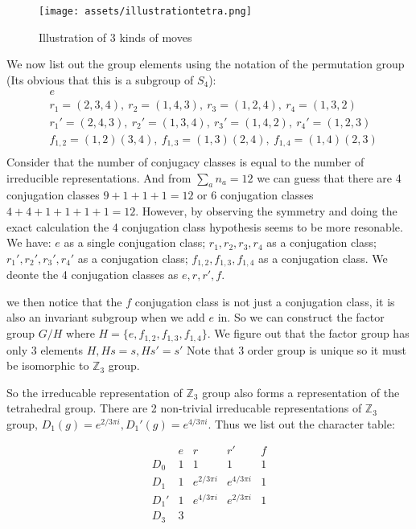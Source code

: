 \begin{figure}[H]
  \centering
  \texttt{[image: assets/illustrationtetra.png]}
  \caption{Illustration of 3 kinds of moves}
  \label{fig:illustrationtetra}
\end{figure}
We now list out the group elements using the notation of the permutation group (Its obvious that this is a subgroup of $ S_4 $):
\begin{equation}
  \begin{aligned}
    &e\\ 
    &r_1 = (2,3,4),\  r_2 = (1,4,3), \ r_3 = (1,2,4), \ r_4 = (1,3,2)\\ 
    &r_1' = (2,4,3),\  r_2' = (1,3,4),\  r_3' = (1,4,2),\  r_4' = (1,2,3)\\
    &f_{1,2} = (1,2)(3,4),\  f_{1,3} = (1,3)(2,4),\  f_{1,4} = (1,4)(2,3)\\ 
  \end{aligned}
  \label{eq:tetrahedralgroup}
\end{equation}
Consider that the number of conjugacy classes is equal to the number of irreducible representations. And from $ \sum_a n_a  = 12$ we can guess that there are 4 conjugation classes $ 9+1+1+1 = 12 $ or 6 conjugation classes $ 4+4+1+1+1+1 = 12 $. However, by observing the symmetry and doing the exact calculation the 4 conjugation class hypothesis seems to be more resonable. We have: $ e $ as a single conjugation class; $ r_1,r_2,r_3,r_4 $ as a conjugation class; $ r_1',r_2',r_3',r_4' $ as a conjugation class; $ f_{1,2},f_{1,3},f_{1,4} $ as a conjugation class. We deonte the 4 conjugation classes as $ e, r, r', f $. 

we then notice that the $ f $ conjugation class is not just a conjugation class, it is also an invariant subgroup when we add $ e $ in. So we can construct the factor group $ G / H $ where $ H = \{ e, f_{1,2},f_{1,3},f_{1,4} \} $. We figure out that the factor group has only 3 elements $ H, Hs = s, Hs' = s' $ Note that 3 order group is unique so it must be isomorphic to $ \mathbb{Z}_3 $ group. 

So the irreducable representation of $ \mathbb{Z}_3 $ group also forms a representation of the tetrahedral group. There are 2 non-trivial irreducable representations of $ \mathbb{Z}_3 $ group, $ D_1(g) = e^{2/3 \pi i}, D_1'(g) = e^{4/3 \pi i} $. Thus we list out the character table: 

\[
 \begin{array}{c|cccc}
  & e & r & r' & f\\
\hline
    D_0  & 1 & 1 & 1 & 1 \\
    D_1  &  1  & e^{2/3\pi i} & e^{4/3\pi i} &  1 \\
    D_1'  &  1 &  e^{4/3\pi i}& e^{2/3\pi i}& 1 \\
    D_3  & 3 &  &  & \\
\end{array}
\]

